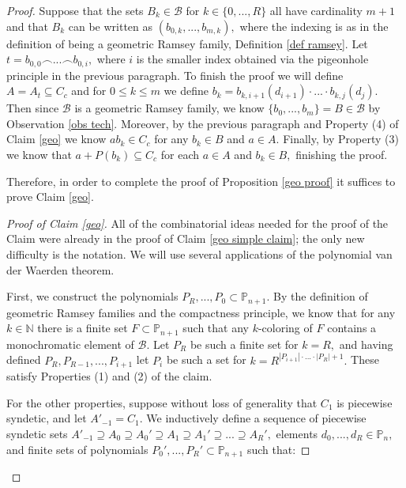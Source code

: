 \documentclass[tocmacros]{daj}
\begin{document}
\begin{proof}
Suppose that the sets $B_k\in\mathcal{B}$ for $k\in \{0,...,R\}$ all have cardinality $m+1$ and that $B_k$ can be written as $(b_{0,k},...,b_{m,k}),$ where the indexing is as in the definition of being a geometric Ramsey family, Definition \ref{def ramsey}.  Let $t=b_{0,0}\smallfrown...\smallfrown b_{0,i},$ where $i$ is the smaller index obtained via the pigeonhole principle in the previous paragraph.  To finish the proof we will define $A=A_t\subseteq C_c$ and for $0\leq k\leq m$ we define $b_k=b_{k,i+1}(d_{i+1})\cdot...\cdot b_{k,j}(d_j).$  Then since $\mathcal{B}$ is a geometric Ramsey family, we know $\{b_0,...,b_m\}=B\in \mathcal{B}$ by Observation \ref{obs tech}.  Moreover, by the previous paragraph and Property (4) of Claim \ref{geo} we know $ab_k\in C_c$ for any $b_k\in B$ and $a\in A.$  Finally, by Property (3) we know that $a+P(b_k)\subseteq C_c$ for each $a\in A$ and $b_k\in B,$ finishing the proof. 

\vspace{2mm}

Therefore, in order to complete the proof of Proposition \ref{geo proof} it suffices to prove Claim \ref{geo}.

\begin{proof}[Proof of Claim \ref{geo}]

All of the combinatorial ideas needed for the proof of the Claim were already in the proof of Claim \ref{geo simple claim}; the only new difficulty is the notation.   We will use several applications of the polynomial van der Waerden theorem.

First, we construct the polynomials $P_R,...,P_0\subset \mathbb{P}_{n+1}.$  By the definition of geometric Ramsey families and the compactness principle, we know that for any $k\in \mathbb{N}$ there is a finite set $F\subset \mathbb{P}_{n+1}$ such that any $k$-coloring of $F$ contains a monochromatic element of $\mathcal{B}.$  Let $P_R$ be such a finite set for $k=R,$ and having defined $P_R,P_{R-1},...,P_{i+1}$ let $P_i$ be such a set for $k=R^{|P_{i+1}|\cdot...\cdot|P_R|+1}.$  These satisfy Properties (1) and (2) of the claim.

For the other properties, suppose without loss of generality that $C_1$ is piecewise syndetic, and let $A'_{-1}=C_1.$  We inductively define a sequence of piecewise syndetic sets $A'_{-1}\supseteq A_0\supseteq A_0'\supseteq A_1\supseteq A_1'\supseteq... \supseteq A_{R}',$ elements $d_0,...,d_R\in \mathbb{P}_n,$ and finite sets of polynomials $P_0',...,P_R'\subset \mathbb{P}_{n+1}$ such that:


\end{proof}
\end{proof}
\end{document}
